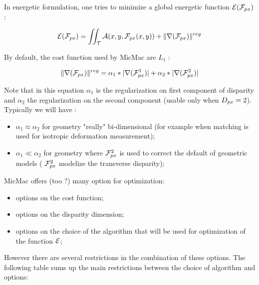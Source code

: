 In energetic formulation, one tries to minimize a global energetic function ${\mathcal E}({\mathcal F}_{px})$  :

\begin{equation}
   {\mathcal E}({\mathcal F}_{px}) = \iint_\mathcal T {\mathcal A}(x,y,{\mathcal F}_{px}(x,y)) + \| \nabla({\mathcal F}_{px}) \|^{reg}
\end{equation}


By default, the cost function used by MicMac are $L_1$  :

\begin{equation}
\label{CostGrad:Lun:DDeux}
   \| \nabla({\mathcal F}_{px}) \|^{reg} = \alpha_1*|\nabla({\mathcal F}_{px}^1)|+\alpha_2*|\nabla({\mathcal F}_{px}^2)|
\end{equation}


Note that in this equation $\alpha_1$ is the regularization on first
component of disparity and $\alpha_2$ the regularization  on the
second component (usable only when $D_{px}=2$). Typically we will have :

\begin{itemize}
   \item $\alpha_1 \approx \alpha_2$ for geometry "really" bi-dimensional
         (for example when matching is used for isotropic deformation  measurement);

   \item $\alpha_1 \ll \alpha_2$ for geometry where  ${\mathcal F}_{px}^2$ is used to correct
         the default of geometric models ( ${\mathcal F}_{px}^2$ modelize the transverse disparity);

\end{itemize}



MicMac offers (too ?) many option for optimization:

\begin{itemize}
    \item  options on the cost function;
    \item  options on the  disparity dimension;
    \item  options  on the choice of the algorithm that will be used
           for optimization of the function  ${\mathcal E}$;
\end{itemize}

However there are several restrictions in the combination of these options.
The following table sums up the main restrictions between the choice of algorithm
and options:


